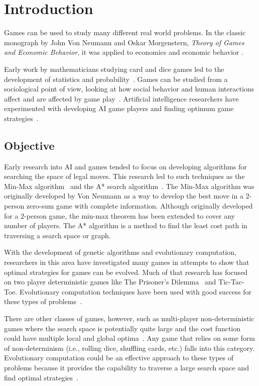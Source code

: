 \clearpage
\newpage
\chapter{Introduction}\label{chap:intro}
Games can be used to study many different real world problems. In the
classic monograph by John Von Neumann and Oskar Morgenstern, \emph{Theory of
Games and Economic Behavior}, it was applied to economics and economic behavior
\cite{neumann1944theory}.

Early work by mathematicians studying card and dice games led to the development
of statistics and probability~\cite{hald1990history,rudas2008handbook}. Games
can be studied from a sociological point of view, looking at how social behavior
and human interactions affect and are affected by game
play~\cite{fararo1992meaning}. Artificial intelligence researchers have
experimented with developing AI game players and finding optimum game
strategies~\cite{russell2010artificial}.

\section{Objective}

Early research into AI and games tended to focus on developing algorithms for
searching the space of legal moves. This research led to such techniques as the
Min-Max algorithm~\cite{neumann1944theory} and the A* search
algorithm~\cite{Hart_Nilsson_Raphael_1968,Hart:1972:LFB:1056777.1056779}. The
Min-Max algorithm was originally developed by Von Neumann as a way to develop
the best move in a 2-person zero-sum game with complete information. Although
originally developed for a 2-person game, the min-max theorem has been extended
to cover any number of players. The A* algorithm is a method to find the least
cost path in traversing a search space or graph.

With the development of genetic algorithms and evolutionary computation,
re\-search\-ers in this area have investigated many games in attempts to show
that optimal strategies for games can be evolved. Much of that research has
focused on two player deterministic games like The Prisoner's
Dilemma~\cite{Flood1958} and Tic-Tac-Toe. Evolutionary computation techniques
have been used with good success for these types of
problems~\cite{DBLP:conf/cig/QuekG07,Fogel1993}.

There are other classes of games, however, such as multi-player
non-deterministic games where the search space is potentially quite large and
the cost function could have multiple local and global
optima~\cite{condon1992complexity,condon1993algorithms,Walker:gamebe:2011}. Any
game that relies on some form of non-determinism (i.e., rolling dice, shuffling
cards, etc.) falls into this category. Evolutionary computation could be an
effective approach to these types of problems because it provides the capability
to traverse a large search space and find optimal
strategies~\cite{Quek_GAPoker,Foster1990219,eriksson2001evolution}.


